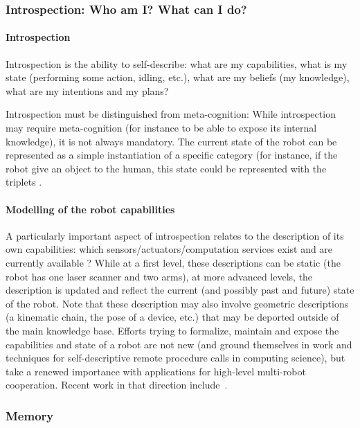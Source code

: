 \subsubsection{Introspection: Who am I? What can I do?}
\label{sect|introspection}

\paragraph{Introspection}

Introspection is the ability to self-describe: what are my capabilities, what
is my state (performing some action, idling, etc.), what are my beliefs (\ie my
knowledge), what are my intentions and my plans?

Introspection must be distinguished from meta-cognition: While introspection
may require meta-cognition (for instance to be able to expose its internal
knowledge), it is not always mandatory. The current state of the robot can be
represented as a simple instantiation of a specific category (for instance, if
the robot give an object to the human, this state could be represented with the
triplets .

\paragraph{Modelling of the robot capabilities}

A particularly important aspect of introspection relates to the description of
its own capabilities: which sensors/actuators/computation services exist and
are currently available ?  While at a first level, these descriptions can be
static (\eg the robot has one laser scanner and two arms), at more advanced
levels, the description is updated and reflect the current (and possibly past
and future) state of the robot. Note that these description may also involve
geometric descriptions (a kinematic chain, the pose of a device, etc.) that may
be deported outside of the main knowledge base. Efforts trying to formalize,
maintain and expose the capabilities and state of a robot are not new (and
ground themselves in work and techniques for self-descriptive remote procedure
calls in computing science), but take a renewed importance with applications
for high-level multi-robot cooperation. Recent work in that direction
include~\cite{Kunze2011}.

\subsubsection{Memory}
\label{sect|memory}

